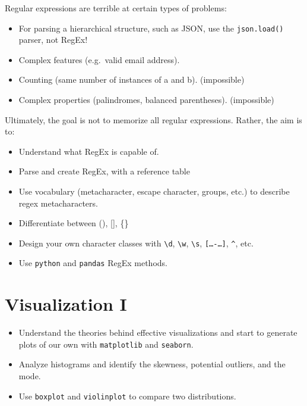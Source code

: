 \documentclass[
  letterpaper,
  DIV=11,
  numbers=noendperiod]{scrreprt}
\providecommand{\tightlist}{%
  \setlength{\itemsep}{0pt}\setlength{\parskip}{0pt}}\usepackage{longtable,booktabs,array}
\begin{document}
Regular expressions are terrible at certain types of problems:

\begin{itemize}
\tightlist
\item
  For parsing a hierarchical structure, such as JSON, use the
  \texttt{json.load()} parser, not RegEx!
\item
  Complex features (e.g.~valid email address).
\item
  Counting (same number of instances of a and b). (impossible)
\item
  Complex properties (palindromes, balanced parentheses). (impossible)
\end{itemize}

Ultimately, the goal is not to memorize all regular expressions. Rather,
the aim is to:

\begin{itemize}
\tightlist
\item
  Understand what RegEx is capable of.
\item
  Parse and create RegEx, with a reference table
\item
  Use vocabulary (metacharacter, escape character, groups, etc.) to
  describe regex metacharacters.
\item
  Differentiate between (), {[}{]}, \{\}
\item
  Design your own character classes with \texttt{\textbackslash{}d},
  \texttt{\textbackslash{}w}, \texttt{\textbackslash{}s},
  \texttt{{[}…-…{]}}, \texttt{\^{}}, etc.
\item
  Use \texttt{python} and \texttt{pandas} RegEx methods.
\end{itemize}


\chapter{Visualization I}\label{visualization-i}

\begin{tcolorbox}[enhanced jigsaw, arc=.35mm, left=2mm, toprule=.15mm, leftrule=.75mm, bottomrule=.15mm, colframe=quarto-callout-note-color-frame, rightrule=.15mm, colbacktitle=quarto-callout-note-color!10!white, opacitybacktitle=0.6, coltitle=black, bottomtitle=1mm, colback=white, toptitle=1mm, title=\textcolor{quarto-callout-note-color}{\faInfo}\hspace{0.5em}{Learning Outcomes}, breakable, opacityback=0, titlerule=0mm]

\begin{itemize}
\tightlist
\item
  Understand the theories behind effective visualizations and start to
  generate plots of our own with \texttt{matplotlib} and
  \texttt{seaborn}.
\item
  Analyze histograms and identify the skewness, potential outliers, and
  the mode.
\item
  Use \texttt{boxplot} and \texttt{violinplot} to compare two
  distributions.
\end{itemize}

\end{tcolorbox}
\end{document}
